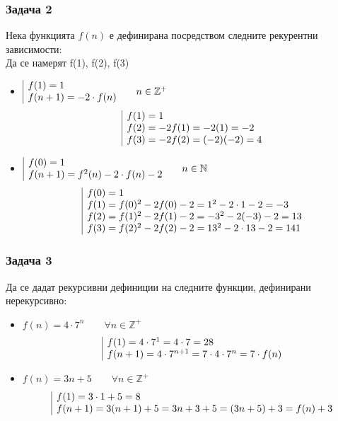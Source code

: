 \documentclass[fleqn, 12pt]{article}
\theoremstyle{definition}
\begin{document}
\subsubsection*{Задача 2}
Нека   функцията $f(n)$ е дефинирана посредством следните рекурентни зависимости:\\
Да се намерят f(1), f(2), f(3)
\begin{itemize}
\item $\begin{array}{|l@{}} f(1) = 1 \\ f(n+1) = -2\cdot f(n) \end{array} \qquad n \in \mathbb{Z}^+$
$$\begin{array}{|l@{}} 
f(1) = 1 \\ 
f(2) = -2f(1) = -2(1) = -2  \\
 f(3) = -2f(2) = (-2)(-2) = 4
\end{array}$$
\item $\begin{array}{|l@{}} f(0) = 1 \\ f(n+1) = f^2(n) -2\cdot f(n) - 2 \end{array} \qquad n \in \mathbb{N}$
$$\begin{array}{|l@{}} 
f(0) = 1 \\ 
f(1) = f(0)^2 - 2f(0) - 2 = 1^2  -2\cdot 1 - 2 = -3 \\
f(2) = f(1)^2 - 2f(1) - 2 = -3^2 - 2(-3) - 2 = 13 \\
f(3) = f(2)^2 - 2f(2) - 2 = 13^2 - 2\cdot 13 - 2 = 141 
\end{array}$$
\end{itemize}

\subsubsection*{Задача 3}
Да се дадат рекурсивни дефиниции на следните функции, дефинирани нерекурсивно:
\begin{itemize}
\item $f(n) = 4\cdot 7^n \qquad \forall n \in \mathbb{Z}^+$
$$\begin{array}{|l@{}} 
f(1) = 4 \cdot 7^1 = 4 \cdot 7 = 28 \\
f(n+1) = 4 \cdot 7^{n+1} = 7 \cdot 4 \cdot 7^n = 7 \cdot f(n) 
\end{array}$$
\item $f(n) = 3n+5 \qquad \forall n \in \mathbb{Z}^+$
$$\begin{array}{|l@{}} 
f(1) =3\cdot 1 + 5 = 8\\
f(n+1) = 3(n+1) + 5 = 3n+3 + 5 = (3n+5) + 3 = f(n) + 3 
\end{array}$$
\end{itemize}
\end{document}
